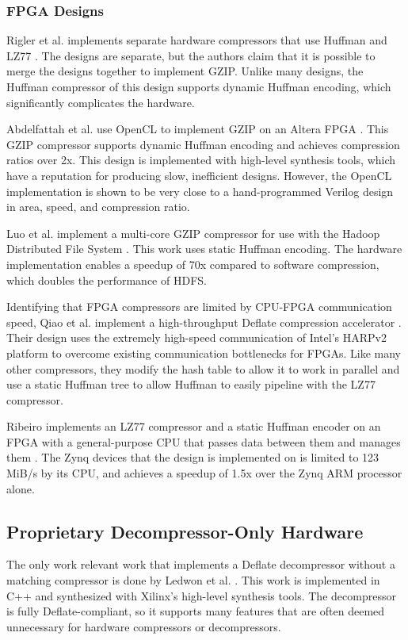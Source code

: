 \documentclass[doublespace,nopageskip]{VTthesis}
\begin{document}
\subsubsection{FPGA Designs}\label{sss:fpga_compressor_designs}
Rigler et al. implements separate hardware compressors that use Huffman and LZ77 \cite{fpgahuffmanlz77}. The designs are separate, but the authors claim that it is possible to merge the designs together to implement GZIP. Unlike many designs, the Huffman compressor of this design supports dynamic Huffman encoding, which significantly complicates the hardware.

Abdelfattah et al. use OpenCL to implement GZIP on an Altera FPGA \cite{gziponachip}. This GZIP compressor supports dynamic Huffman encoding and achieves compression ratios over 2x. This design is implemented with high-level synthesis tools, which have a reputation for producing slow, inefficient designs. However, the OpenCL implementation is shown to be very close to a hand-programmed Verilog design in area, speed, and compression ratio.

Luo et al. implement a multi-core GZIP compressor for use with the Hadoop Distributed File System \cite{hdfsgzip}. This work uses static Huffman encoding. The hardware implementation enables a speedup of 70x compared to software compression, which doubles the performance of HDFS.

Identifying that FPGA compressors are limited by CPU-FPGA communication speed, Qiao et al. implement a high-throughput Deflate compression accelerator \cite{fpgadeflate}. Their design uses the extremely high-speed communication of Intel's HARPv2 platform to overcome existing communication bottlenecks for FPGAs. Like many other compressors, they modify the hash table to allow it to work in parallel and use a static Huffman tree to allow Huffman to easily pipeline with the LZ77 compressor.

Ribeiro implements an LZ77 compressor and a static Huffman encoder on an FPGA with a general-purpose CPU that passes data between them and manages them \cite{ribeiro}. The Zynq devices that the design is implemented on is limited to 123 MiB/s by its CPU, and achieves a speedup of 1.5x over the Zynq ARM processor alone.

\subsection{Proprietary Decompressor-Only Hardware}\label{ss:proprietary_decompressor-only_hardware}
The only work relevant work that implements a Deflate decompressor without a matching compressor is done by Ledwon et al. \cite{deflatedecompression}. This work is implemented in C++ and synthesized with Xilinx's high-level synthesis tools. The decompressor is fully Deflate-compliant, so it supports many features that are often deemed unnecessary for hardware compressors or decompressors.
\end{document}
